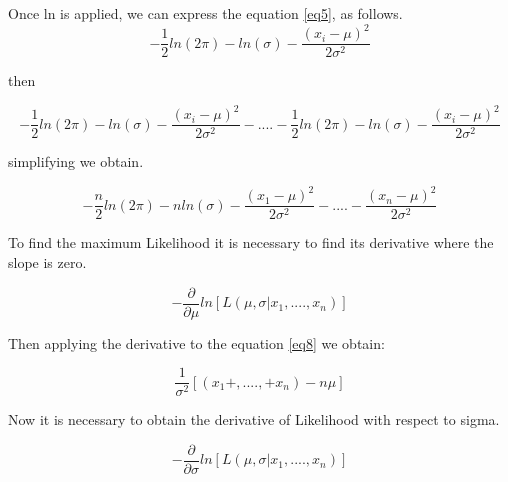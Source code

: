 \documentclass[letterpaper,12pt,openright,oneside]{article}
\begin{document}
Once ln is applied, we can express the equation \ref{eq5}, as follows. \\

\begin{equation}
-\frac{1}{2}ln(2\pi) - ln(\sigma)-\frac{(x_{i}-\mu)^2}{2\sigma^2} 
\end{equation} 

then

\begin{equation}
-\frac{1}{2}ln(2\pi) - ln(\sigma)-\frac{(x_{i}-\mu)^2}{2\sigma^2} -.... -\frac{1}{2}ln(2\pi) - ln(\sigma)-\frac{(x_{i}-\mu)^2}{2\sigma^2}
\end{equation} 

simplifying we obtain.
 
\begin{equation}
-\frac{n}{2}ln(2\pi) - nln(\sigma)-\frac{(x_{1}-\mu)^2}{2\sigma^2} -.... -\frac{(x_{n}-\mu)^2}{2\sigma^2} 
\end{equation} 


To find the maximum Likelihood it is necessary to find its derivative where the slope is zero.

\begin{equation}\label{eq8}
-\frac{\partial}{\partial \mu}ln[L(\mu, \sigma|x_{1},....,x_{n})] 
\end{equation} 


Then applying the derivative to the equation \ref{eq8} we obtain:

\begin{equation}\label{eq6}
\frac{1}{\sigma^2}[(x_{1} + ,...., + x_{n}) -n \mu] 
\end{equation} 
  

Now it is necessary to obtain the derivative of Likelihood with respect to sigma.

\begin{equation}
-\frac{\partial}{\partial \sigma}ln[L(\mu, \sigma|x_{1},....,x_{n})] 
\end{equation}   
  
\end{document}
